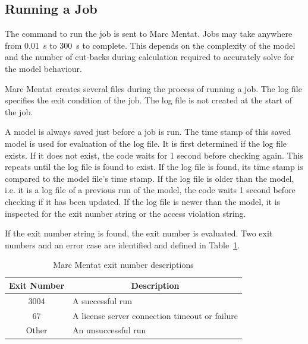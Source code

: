 \subsection{Running a Job}
\label{ssec:run}

The command to run the job is sent to Marc Mentat. Jobs may take anywhere from \SI{0.01}{\second} to \SI{300}{\second} to complete. This depends on the complexity of the model and the number of cut-backs during calculation required to accurately solve for the model behaviour.

Marc Mentat creates several files during the process of running a job. The log file specifies the exit condition of the job. The log file is not created at the start of the job.

A model is always saved just before a job is run. The time stamp of this saved model is used for evaluation of the log file. It is first determined if the log file exists. If it does not exist, the code waits for 1 second before checking again. This repeats until the log file is found to exist. If the log file is found, its time stamp is compared to the model file's time stamp. If the log file is older than the model, i.e. it is a log file of a previous run of the model, the code waits 1 second before checking if it has been updated. If the log file is newer than the model, it is inspected for the exit number string or the access violation string.

If the exit number string is found, the exit number is evaluated. Two exit numbers and an error case are identified and defined in Table~\ref{tab:exno}.

\begin{table}[ht]
\centering
\begin{tabular}{@{}cl@{}}
\toprule
\textbf{Exit Number} & \multicolumn{1}{c}{\textbf{Description}}       \\ \midrule
3004                 & A successful run                               \\
67                   & A license server connection timeout or failure \\
Other                & An unsuccessful run                            \\ \bottomrule
\end{tabular}
\caption{Marc Mentat exit number descriptions}
\label{tab:exno}
\end{table}

